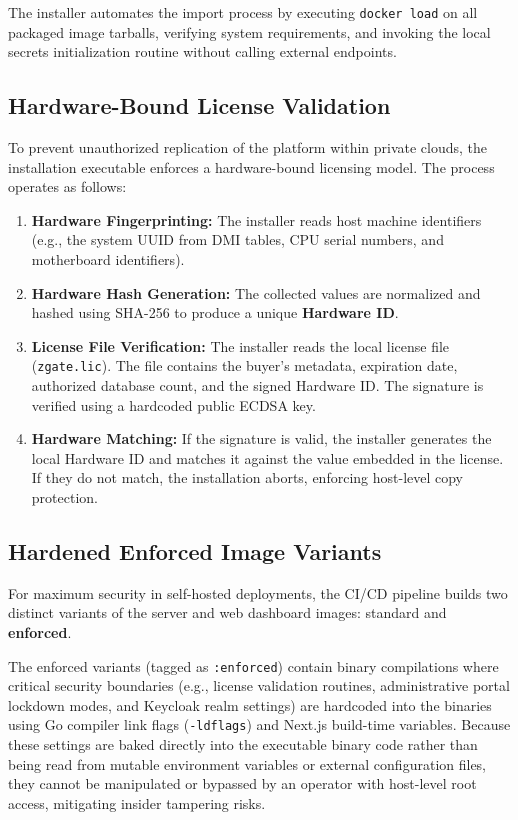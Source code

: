 The installer automates the import process by executing \texttt{docker load} on all packaged image tarballs, verifying system requirements, and invoking the local secrets initialization routine without calling external endpoints.

\subsection{Hardware-Bound License Validation}
To prevent unauthorized replication of the platform within private clouds, the installation executable enforces a hardware-bound licensing model. The process operates as follows:

\begin{enumerate}
    \item \textbf{Hardware Fingerprinting:} The installer reads host machine identifiers (e.g., the system UUID from DMI tables, CPU serial numbers, and motherboard identifiers).
    \item \textbf{Hardware Hash Generation:} The collected values are normalized and hashed using SHA-256 to produce a unique \textbf{Hardware ID}.
    \item \textbf{License File Verification:} The installer reads the local license file (\texttt{zgate.lic}). The file contains the buyer's metadata, expiration date, authorized database count, and the signed Hardware ID. The signature is verified using a hardcoded public ECDSA key.
    \item \textbf{Hardware Matching:} If the signature is valid, the installer generates the local Hardware ID and matches it against the value embedded in the license. If they do not match, the installation aborts, enforcing host-level copy protection.
\end{enumerate}

\subsection{Hardened Enforced Image Variants}
For maximum security in self-hosted deployments, the CI/CD pipeline builds two distinct variants of the server and web dashboard images: standard and \textbf{enforced}.

The enforced variants (tagged as \texttt{:enforced}) contain binary compilations where critical security boundaries (e.g., license validation routines, administrative portal lockdown modes, and Keycloak realm settings) are hardcoded into the binaries using Go compiler link flags (\texttt{-ldflags}) and Next.js build-time variables. Because these settings are baked directly into the executable binary code rather than being read from mutable environment variables or external configuration files, they cannot be manipulated or bypassed by an operator with host-level root access, mitigating insider tampering risks.

